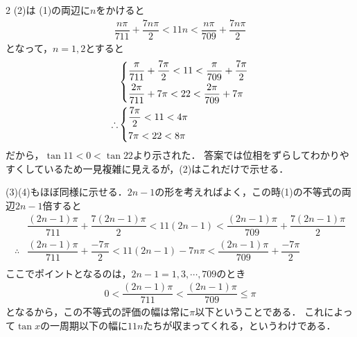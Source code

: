 \documentclass[../../main.tex]{subfiles}
\begin{document}
\begin{multicols}{2}
  (2)は
  (1)の両辺に$n$をかけると
  \begin{align*}
    \dfrac{n\pi}{711} + \dfrac{7n\pi}{2} < 11n < \dfrac{n\pi}{709} + \dfrac{7n\pi}{2}
  \end{align*}
  となって，$n=1,2$とすると
  \begin{align*}
     & \begin{dcases}
         \dfrac{\pi}{711} + \dfrac{7\pi}{2} < 11 < \dfrac{\pi}{709} + \dfrac{7\pi}{2} \\
         \dfrac{2\pi}{711} + 7\pi < 22 < \dfrac{2\pi}{709} + 7\pi
       \end{dcases} \\
    \therefore
     & \begin{dcases}
         \dfrac{7\pi}{2} < 11 < 4\pi \\
         7\pi < 22 < 8\pi
       \end{dcases}
  \end{align*}
  だから，$\tan 11 < 0 < \tan 22$より示された．
  答案では位相をずらしてわかりやすくしているため一見複雑に見えるが，(2)はこれだけで示せる．

  (3)(4)もほぼ同様に示せる．$2n-1$の形を考えればよく，この時(1)の不等式の両辺$2n-1$倍すると
  \begin{align*}
     & \dfrac{(2n-1)\pi}{711} + \dfrac{7(2n-1)\pi}{2} < 11(2n-1) < \dfrac{(2n-1)\pi}{709} + \dfrac{7(2n-1)\pi}{2} \\
    \therefore
     & \dfrac{(2n-1)\pi}{711} + \dfrac{-7\pi}{2} < 11(2n-1) - 7n\pi < \dfrac{(2n-1)\pi}{709} + \dfrac{-7\pi}{2}   \\
  \end{align*}
  ここでポイントとなるのは，$2n-1=1,3,\cdots,709$のとき
  \begin{align*}
    0< \dfrac{(2n-1)\pi}{711} < \dfrac{(2n-1)\pi}{709} \le \pi
  \end{align*}
  となるから，この不等式の評価の幅は常に$\pi$以下ということである．
  これによって$\tan x$の一周期以下の幅に$11n$たちが収まってくれる，というわけである．


  \newpage
\end{multicols}
\end{document}
